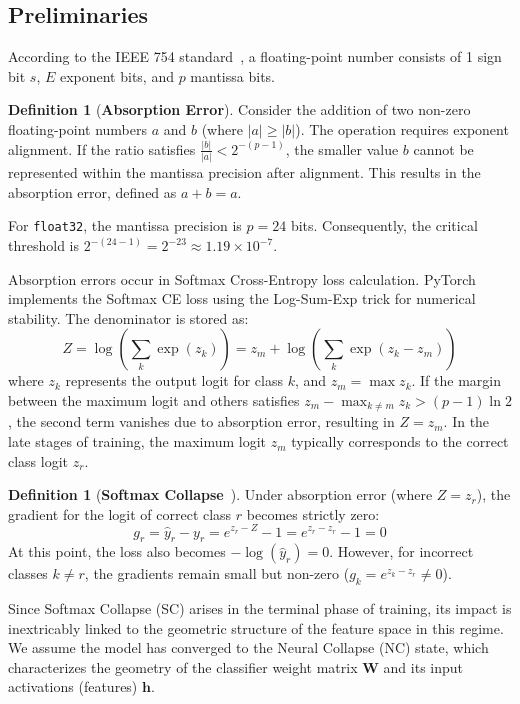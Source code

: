 \documentclass{article}
\theoremstyle{plain}
\theoremstyle{definition}
\newtheorem{definition}[theorem]{Definition}
\theoremstyle{remark}
\begin{document}
\subsection{Preliminaries}
According to the IEEE 754 standard~\cite{IEEE754-2019}, 
a floating-point number consists of 1 sign bit $s$, $E$ exponent bits, and $p$ mantissa bits.

\begin{definition}[\textbf{Absorption Error}]
Consider the addition of two non-zero floating-point numbers $a$ and $b$ (where $|a| \ge |b|$). The operation requires exponent alignment. If the ratio satisfies
$\frac{|b|}{|a|} < 2^{-(p-1)}$,
the smaller value $b$ cannot be represented within the mantissa precision after alignment. This results in the absorption error, defined as $a + b = a$.
\end{definition}
For \texttt{float32}, the mantissa precision is $p=24$ bits. 
Consequently, the critical threshold is $2^{-(24-1)} = 2^{-23} \approx 1.19 \times 10^{-7}$.

Absorption errors occur in Softmax Cross-Entropy loss calculation.
PyTorch \cite{paszke2019} implements the Softmax CE loss using the Log-Sum-Exp trick for numerical stability. 
The denominator is stored as:
\begin{equation}
Z = \log\left(\sum_k \exp(z_k)\right) = z_m + \log\left(\sum_k \exp(z_k - z_m)\right)
\end{equation}
where $z_k$ represents the output logit for class $k$, and $z_m = \max z_k$.
If the margin between the maximum logit and others satisfies $z_m - \max_{k \neq m} z_k > (p-1)\ln 2$, 
the second term vanishes due to absorption error, resulting in $Z = z_m$.
In the late stages of training, the maximum logit $z_m$ typically corresponds to the correct class logit $z_r$. 
\begin{definition}[\textbf{Softmax Collapse}~\cite{prieto2025}]
Under absorption error (where $Z = z_r$), the gradient for the logit of correct class $r$ becomes strictly zero:
\begin{equation}
g_r = \hat{y}_r - y_r = e^{z_r - Z} - 1 = e^{z_r - z_r} - 1 = 0
\end{equation}
At this point, the loss also becomes $-\log(\hat{y}_r) = 0$. 
However, for incorrect classes $k \neq r$, the gradients remain small but non-zero ($g_k = e^{z_k - z_r} \neq 0$). 
\end{definition}

Since Softmax Collapse (SC) arises in the terminal phase of training, 
its impact is inextricably linked to the geometric structure of the feature space in this regime.
We assume the model has converged to the Neural Collapse (NC) state,
which characterizes the geometry of
the classifier weight matrix $\bm{W}$ and its input activations (features) $\bm{h}$.
\end{document}
